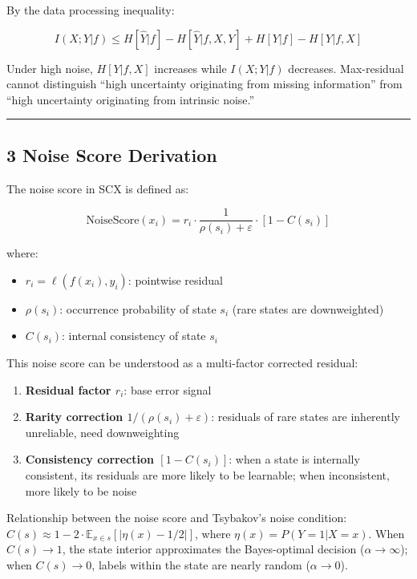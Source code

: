 \documentclass[
  12pt,
]{article}
\providecommand{\tightlist}{%
  \setlength{\itemsep}{0pt}\setlength{\parskip}{0pt}}
\begin{document}
By the data processing inequality:

\[I(X; Y | f) \leq H[\hat{Y}|f] - H[\hat{Y}|f, X, Y] + H[Y|f] - H[Y|f, X]\]

Under high noise, \(H[Y|f, X]\) increases while \(I(X; Y|f)\) decreases. Max-residual
cannot distinguish ``high uncertainty originating from missing information'' from ``high uncertainty originating from intrinsic noise.''

\begin{center}\rule{0.5\linewidth}{0.5pt}\end{center}

\subsection{3 Noise Score Derivation}\label{noise-score-derivation}

The noise score in SCX is defined as:

\[\text{NoiseScore}(x_i) = r_i \cdot \frac{1}{\rho(s_i) + \varepsilon} \cdot [1 - C(s_i)]\]

where:

\begin{itemize}
\tightlist
\item
  \(r_i = \ell(f(x_i), y_i)\): pointwise residual
\item
  \(\rho(s_i)\): occurrence probability of state \(s_i\) (rare states are downweighted)
\item
  \(C(s_i)\): internal consistency of state \(s_i\)
\end{itemize}

This noise score can be understood as a multi-factor corrected residual:

\begin{enumerate}
\def\labelenumi{\arabic{enumi}.}
\tightlist
\item
  \textbf{Residual factor \(r_i\)}: base error signal
\item
  \textbf{Rarity correction
  \(1/(\rho(s_i)+\varepsilon)\)}: residuals of rare states are inherently unreliable, need downweighting
\item
  \textbf{Consistency correction \([1 - C(s_i)]\)}: when a state is internally consistent, its residuals are more likely to be
  learnable; when inconsistent, more likely to be noise
\end{enumerate}

Relationship between the noise score and Tsybakov's
noise condition: \(C(s) \approx 1 - 2 \cdot \mathbb{E}_{x \in s}[|\eta(x) - 1/2|]\), where
\(\eta(x) = P(Y=1|X=x)\). When \(C(s) \to 1\),
the state interior approximates the Bayes-optimal decision (\(\alpha \to \infty\)); when
\(C(s) \to 0\), labels within the state are nearly random (\(\alpha \to 0\)).
\end{document}
